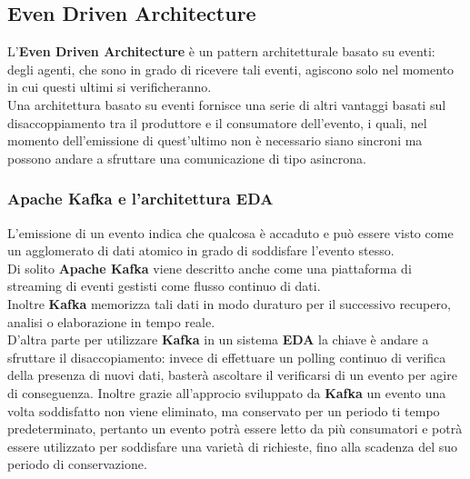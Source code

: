 \subsection{Even Driven Architecture}
L'\textbf{Even Driven Architecture} è un pattern architetturale basato su eventi: degli agenti, che sono in grado di ricevere tali eventi, agiscono solo nel momento in cui questi ultimi si verificheranno. 
\\Una architettura basato su eventi fornisce una serie di altri vantaggi basati sul disaccoppiamento tra il produttore e il consumatore dell'evento, i quali, nel momento dell'emissione di quest'ultimo non è necessario siano sincroni ma possono andare a sfruttare una comunicazione di tipo asincrona. 
\subsubsection{Apache Kafka e l'architettura EDA}
L'emissione di un evento indica che qualcosa è accaduto e può essere visto come un agglomerato di dati atomico in grado di soddisfare l'evento stesso. \\
Di solito \textbf{Apache Kafka} viene descritto anche come una piattaforma di \gls{streaming di eventi}{} gestisti come flusso continuo di dati. \\Inoltre \textbf{Kafka} memorizza tali dati in modo duraturo per il successivo recupero, analisi o elaborazione in tempo reale.
\\D'altra parte per utilizzare \textbf{Kafka} in un sistema \textbf{EDA} la chiave è andare a sfruttare il disaccopiamento: invece di effettuare un polling continuo di verifica della presenza di nuovi dati, basterà ascoltare il verificarsi di un evento per agire di conseguenza. Inoltre grazie all'approcio sviluppato da \textbf{Kafka} un evento una volta soddisfatto non viene eliminato, ma conservato per un periodo ti tempo predeterminato, pertanto un evento potrà essere letto da più consumatori e potrà essere utilizzato per soddisfare una varietà di richieste, fino alla scadenza del suo periodo di conservazione. \\
\pagebreak
